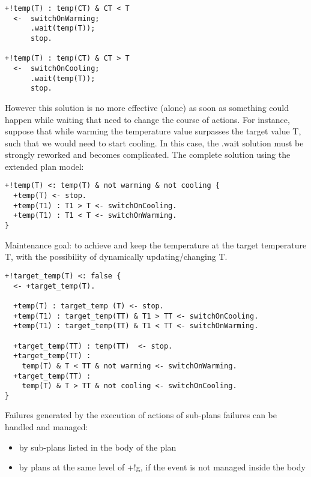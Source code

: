 {\small
\begin{verbatim}
+!temp(T) : temp(CT) & CT < T 
  <-  switchOnWarming;
      .wait(temp(T));
      stop.

+!temp(T) : temp(CT) & CT > T 
  <-  switchOnCooling;
      .wait(temp(T));
      stop.
\end{verbatim}}

\noindent However this solution is no more effective (alone) as soon as something could happen while waiting that need to change the course of actions.  
%
For instance, suppose that while warming the temperature value surpasses the target value T, such that we would need to start cooling. In this case, the .wait solution must be strongly reworked and becomes complicated.
%
The complete solution using the extended plan model:

{\small
\begin{verbatim}
+!temp(T) <: temp(T) & not warming & not cooling {
  +temp(T) <- stop.		
  +temp(T1) : T1 > T <- switchOnCooling.	
  +temp(T1) : T1 < T <- switchOnWarming.		
}\end{verbatim}}


\noindent Maintenance goal: to achieve and keep the temperature at the target temperature T, with the possibility of dynamically updating/changing T.

{\small
\begin{verbatim}
+!target_temp(T) <: false {
  <- +target_temp(T).	
 
  +temp(T) : target_temp (T) <- stop.		
  +temp(T1) : target_temp(TT) & T1 > TT <- switchOnCooling.	  
  +temp(T1) : target_temp(TT) & T1 < TT <- switchOnWarming.
 
  +target_temp(TT) : temp(TT)  <- stop.	
  +target_temp(TT) : 
    temp(T) & T < TT & not warming <- switchOnWarming.
  +target_temp(TT) : 
    temp(T) & T > TT & not cooling <- switchOnCooling.
}
\end{verbatim}}


Failures generated by the execution of actions of sub-plans failures can be handled and managed:

\begin{itemize}
\item by sub-plans listed in the body of the plan
\item by plans at the same level of +!g, if the event is not managed inside the body
\end{itemize}

